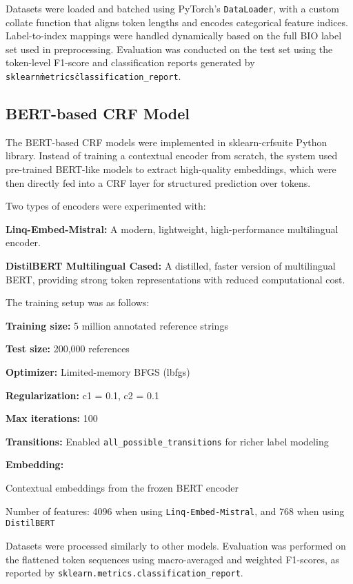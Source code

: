 Datasets were loaded and batched using PyTorch's \texttt{DataLoader}, with a custom collate function that aligns token lengths and encodes categorical feature indices. Label-to-index mappings were handled dynamically based on the full BIO label set used in preprocessing.
Evaluation was conducted on the test set using the token-level F1-score and classification reports generated by \texttt{sklearn\.metrics\.classification\_report}.

\subsection{BERT-based CRF Model}
The BERT-based CRF models were implemented in sklearn-crfsuite Python library. Instead of training a contextual encoder from scratch, the system used pre-trained BERT-like models to extract high-quality embeddings, which were then directly fed into a CRF layer for structured prediction over tokens.

Two types of encoders were experimented with:
\begin{compactitem}
\item \textbf{Linq-Embed-Mistral:} A modern, lightweight, high-performance multilingual encoder.
\item \textbf{DistilBERT Multilingual Cased:} A distilled, faster version of multilingual BERT, providing strong token representations with reduced computational cost.
\end{compactitem}

The training setup was as follows:
\begin{compactitem}
\item \textbf{Training size:} 5 million annotated reference strings
\item \textbf{Test size:} 200,000 references
\item \textbf{Optimizer:} Limited-memory BFGS (lbfgs)
\item \textbf{Regularization:} c1 = 0.1, c2 = 0.1
\item \textbf{Max iterations:} 100
\item \textbf{Transitions:} Enabled \texttt{all\_possible\_transitions} for richer label modeling
\item \textbf{Embedding:}
\begin{compactitem}
    \item Contextual embeddings from the frozen BERT encoder
    \item Number of features: 4096 when using \texttt{Linq-Embed-Mistral}, and 768 when using \texttt{DistilBERT} 
\end{compactitem}
\end{compactitem}

Datasets were processed similarly to other models. Evaluation was performed on the flattened token sequences using macro-averaged and weighted F1-scores, as reported by \texttt{sklearn.metrics.classification\_report}.
